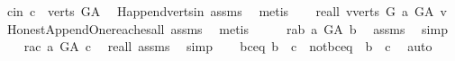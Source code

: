 \begin{isabellebody}
\ c{\isacharunderscore}{\kern0pt}in{\isacharcolon}{\kern0pt}\ {\isachardoublequoteopen}c\ {\isasymin}\ verts\ G{\isacharunderscore}{\kern0pt}A{\isachardoublequoteclose}\ \isamarkupfalse%
\ H{\isachardot}{\kern0pt}append{\isacharunderscore}{\kern0pt}verts{\isacharunderscore}{\kern0pt}in\ assms{\isacharparenleft}{\kern0pt}{}{\isacharparenright}{\kern0pt}\ \isamarkupfalse%
\ metis\isanewline
\ \ \isamarkupfalse%
\ re{\isacharunderscore}{\kern0pt}all{\isacharcolon}{\kern0pt}\ {\isachardoublequoteopen}{\isasymforall}v{\isasymin}verts\ G{\isachardot}{\kern0pt}\ a\ {\isasymrightarrow}\isactrlsup {\isacharplus}{\kern0pt}\isactrlbsub G{\isacharunderscore}{\kern0pt}A\isactrlesub \ v{\isachardoublequoteclose}\ \isamarkupfalse%
\ Honest{\isacharunderscore}{\kern0pt}Append{\isacharunderscore}{\kern0pt}One{\isachardot}{\kern0pt}reaches{\isacharunderscore}{\kern0pt}all\ assms{\isacharparenleft}{\kern0pt}{}{\isacharparenright}{\kern0pt}\ \isamarkupfalse%
\ metis\isanewline
\ \ \isamarkupfalse%
\ \isamarkupfalse%
\ r{\isacharunderscore}{\kern0pt}ab{\isacharcolon}{\kern0pt}\ {\isachardoublequoteopen}a\ {\isasymrightarrow}\isactrlsup {\isacharplus}{\kern0pt}\isactrlbsub G{\isacharunderscore}{\kern0pt}A\isactrlesub \ b{\isachardoublequoteclose}\ \isamarkupfalse%
\ assms{\isacharparenleft}{\kern0pt}{}{\isacharparenright}{\kern0pt}\ \isamarkupfalse%
\ simp\isanewline
\ \ \isamarkupfalse%
\ r{\isacharunderscore}{\kern0pt}ac{\isacharcolon}{\kern0pt}\ {\isachardoublequoteopen}a\ {\isasymrightarrow}\isactrlsup {\isacharplus}{\kern0pt}\isactrlbsub G{\isacharunderscore}{\kern0pt}A\isactrlesub \ c{\isachardoublequoteclose}\ \isamarkupfalse%
\ re{\isacharunderscore}{\kern0pt}all\ assms{\isacharparenleft}{\kern0pt}{}{\isacharparenright}{\kern0pt}\ \isamarkupfalse%
\ simp\isanewline
\ \ \isamarkupfalse%
\ {\isacharparenleft}{\kern0pt}b{\isacharunderscore}{\kern0pt}c{\isacharunderscore}{\kern0pt}eq{\isacharparenright}{\kern0pt}\ {\isachardoublequoteopen}b\ {\isacharequal}{\kern0pt}\ c{\isachardoublequoteclose}\ {\isacharbar}{\kern0pt}\ {\isacharparenleft}{\kern0pt}not{\isacharunderscore}{\kern0pt}b{\isacharunderscore}{\kern0pt}c{\isacharunderscore}{\kern0pt}eq{\isacharparenright}{\kern0pt}\ {\isachardoublequoteopen}{\isasymnot}\ b\ {\isacharequal}{\kern0pt}\ c{\isachardoublequoteclose}\ \isamarkupfalse%
\ auto\ \isanewline

\end{isabellebody}
